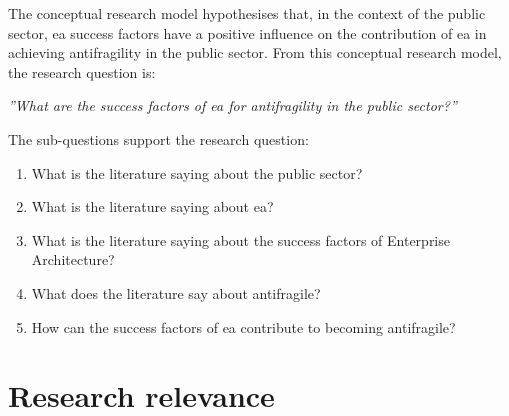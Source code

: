 The conceptual research model hypothesises that, in the context of the public sector, \acrlong{ea} success factors have a positive influence on the contribution of \acrlong{ea} in achieving antifragility in the public sector. From this conceptual research model, the research question is:\bigskip

\noindent \emph{''What are the success factors of \acrlong{ea} for \gls{antifragility} in the public sector?''}\bigskip

The sub-questions support the research question:

\begin{enumerate}
	\item{What is the literature saying about the public sector?}
	\item{What is the literature saying about \acrlong{ea}?}
	\item{What is the literature saying about the success factors of Enterprise Architecture?}
	\item{What does the literature say about antifragile?}
	\item{How can the success factors of \acrlong{ea} contribute to becoming antifragile?}
\end{enumerate}
\section{Research relevance}
\label{sec:researchrelevance}

